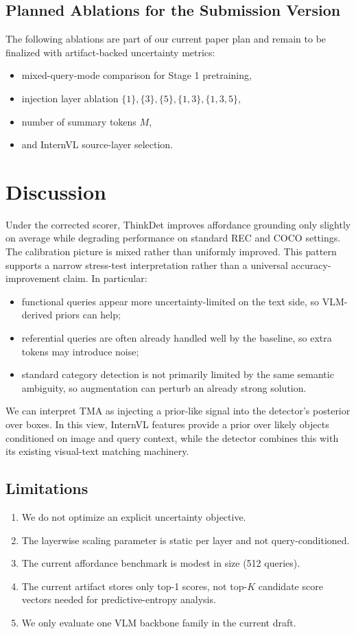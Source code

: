 \documentclass{uai2026} %
\begin{document}
\subsection{Planned Ablations for the Submission Version}
The following ablations are part of our current paper plan and remain to be finalized with artifact-backed uncertainty metrics:
\begin{itemize}
\item mixed-query-mode comparison for Stage 1 pretraining,
\item injection layer ablation \(\{1\}, \{3\}, \{5\}, \{1,3\}, \{1,3,5\}\),
\item number of summary tokens \(M\),
\item and InternVL source-layer selection.
\end{itemize}

\section{Discussion}\label{sec:discussion}
Under the corrected scorer, ThinkDet improves affordance grounding only
slightly on average while degrading performance on standard REC and COCO
settings. The calibration picture is mixed rather than uniformly improved.
This pattern supports a narrow stress-test interpretation rather than a
universal accuracy-improvement claim. In particular:
\begin{itemize}
\item functional queries appear more uncertainty-limited on the text side, so VLM-derived priors can help;
\item referential queries are often already handled well by the baseline, so extra tokens may introduce noise;
\item standard category detection is not primarily limited by the same semantic ambiguity, so augmentation can perturb an already strong solution.
\end{itemize}

We can interpret TMA as injecting a prior-like signal into the detector's posterior over boxes. In this view, InternVL features provide a prior over likely objects conditioned on image and query context, while the detector combines this with its existing visual-text matching machinery.

\subsection{Limitations}
\begin{enumerate}
\item We do not optimize an explicit uncertainty objective.
\item The layerwise scaling parameter is static per layer and not query-conditioned.
\item The current affordance benchmark is modest in size (512 queries).
\item The current artifact stores only top-1 scores, not top-\(K\) candidate score vectors needed for predictive-entropy analysis.
\item We only evaluate one VLM backbone family in the current draft.
\end{enumerate}
\end{document}
